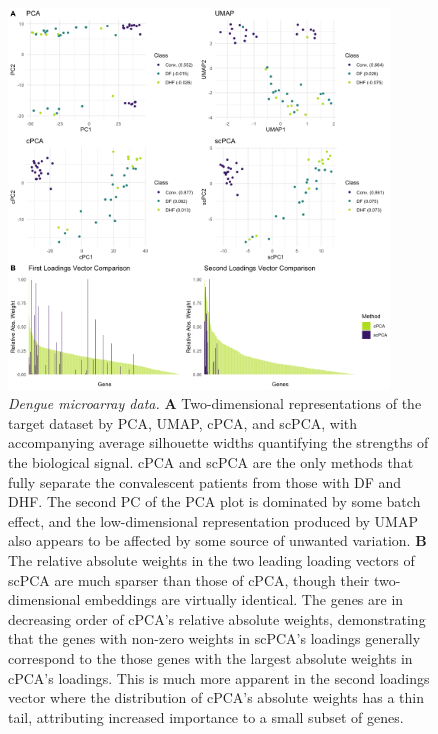 \begin{figure}[!htbp]
  \centering
  \includegraphics[width = 0.9\textwidth]{figures/dengue_results.png}
  \caption{
  {\em Dengue microarray data.}
  \textbf{A} Two-dimensional representations of the target dataset by PCA, UMAP, cPCA, and scPCA, with accompanying average silhouette widths quantifying the strengths of the biological signal.  cPCA and scPCA are the only methods that fully separate the convalescent patients from those with DF and DHF. The second PC of the PCA plot is dominated by some batch effect, and the low-dimensional representation produced by UMAP also appears to be affected by some source of unwanted variation. \textbf{B} The relative absolute weights in the two leading loading vectors of scPCA are much sparser than those of cPCA, though their two-dimensional embeddings are virtually identical. The genes are in decreasing order of cPCA's relative absolute weights, demonstrating that the genes with non-zero weights in scPCA's loadings generally correspond to the those genes with the largest absolute weights in cPCA's loadings. This is much more apparent in the second loadings vector where the distribution of cPCA's absolute weights has a thin tail, attributing increased importance to a small subset of genes.}
  \label{fig:dengue}
\end{figure}


